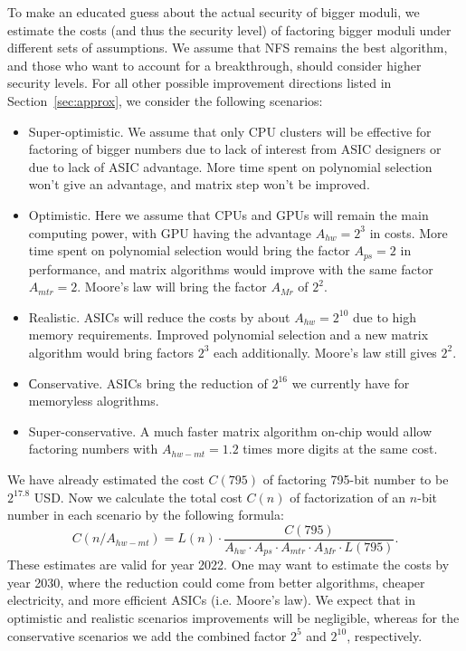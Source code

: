 \documentclass[a4paper]{article}
\begin{document}
 To make an educated guess about the actual security of bigger moduli, we estimate the costs (and thus the security level) of factoring bigger moduli under different sets of assumptions. We assume that NFS remains the best algorithm, and those who want to account for a breakthrough, should consider higher security levels. For all other possible improvement directions listed in Section~\ref{sec:approx}, we consider the following scenarios:
\begin{itemize}
    \item Super-optimistic. We assume that only CPU clusters will be effective for factoring of bigger numbers due to lack of interest from ASIC designers or due to lack of ASIC advantage. More time spent on polynomial selection won't give an advantage, and matrix step won't be improved.
    \item Optimistic. Here we assume that CPUs and GPUs will remain the main computing power, with GPU having the advantage $A_{hw}=2^3$ in costs. More time spent on polynomial selection would bring the factor $A_{ps}=2$ in performance, and matrix algorithms would improve with the same factor $A_{mtr}=2$. Moore's law will bring the factor $A_{Mr}$ of $2^2$.
    \item Realistic. ASICs will reduce the costs  by about $A_{hw}=2^{10}$ due to high memory requirements. Improved polynomial selection and a new matrix algorithm would bring factors $2^3$ each additionally. Moore's law still gives $2^2$.
     \item Сonservative. ASICs bring the  reduction of $2^{16}$ we currently have for memoryless alogrithms.
     \item Super-conservative. A much faster matrix algorithm on-chip would allow factoring numbers with $A_{hw-mt}=1.2$ times more digits at the same cost.
 \end{itemize}

We have already estimated the cost $C(795)$ of factoring 795-bit number to be $2^{17.8}$ USD.
Now we calculate the total cost $C(n)$ of factorization of an $n$-bit number in each scenario by the following formula:
\begin{equation}
    C(n/A_{hw-mt}) =L(n) \cdot \frac{ C(795)}{ A_{hw}\cdot A_{ps} \cdot A_{mtr} \cdot A_{Mr} \cdot L(795)}.
\end{equation}
These estimates are valid for year 2022. One may want to estimate the costs by year 2030, where the reduction could come from better algorithms, cheaper electricity, and more efficient ASICs (i.e. Moore's law). We expect that in optimistic and realistic scenarios improvements will be negligible, whereas for the conservative scenarios we add the combined factor $2^5$ and $2^{10}$, respectively.
 
\end{document}
